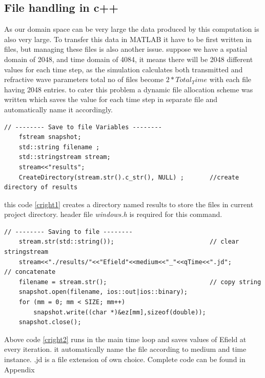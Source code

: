 \subsection{File handling in c++}
As our domain space can be very large the data produced by this computation is also very large. To transfer this data in MATLAB it have to be first written in files, but managing these files is also another issue. suppose we have a spatial domain of 2048, and time domain of 4084, it means there will be 2048 different values for each time step, as the simulation calculates both transmitted and refractive wave parameters total no of files become $2*Total_Time$ with each file having 2048 entries.
to cater this problem a dynamic file allocation scheme was written which saves the value for each time step in separate file and automatically name it accordingly.
\begin{lstlisting}
// -------- Save to file Variables -------- 
	fstream snapshot;
	std::string filename ;
	std::stringstream stream;
	stream<<"results";
	CreateDirectory(stream.str().c_str(), NULL) ;		//create directory of results
\end{lstlisting}
this code \ref{cright1} creates a directory named results to store the files in current project directory. header file \emph{windows.h} is required for this command.
\begin{lstlisting}
// -------- Saving to file -------- 
	stream.str(std::string());   						// clear stringstream
	stream<<"./results/"<<"Efield"<<medium<<"_"<<qTime<<".jd";   		// concatenate
	filename = stream.str();		 					// copy string
	snapshot.open(filename, ios::out|ios::binary);
	for (mm = 0; mm < SIZE; mm++)
		snapshot.write((char *)&ez[mm],sizeof(double));
	snapshot.close();
\end{lstlisting}
Above code \ref{cright2} runs in the main time loop and saves values of Efield at every iteration. it automatically name the file according to medium and time instance. .jd is a file extension of own choice. Complete code can be found in Appendix %

